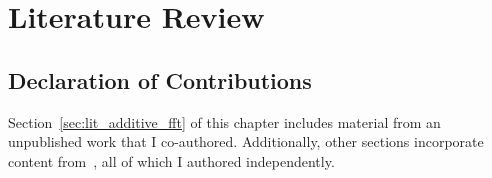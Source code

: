 \chapter{Literature Review}\label{ch:lit_review}

\section*{Declaration of Contributions}
Section~\ref{sec:lit_additive_fft} of this chapter includes material from an unpublished work that I co-authored. Additionally, other sections incorporate content from~\cite{Badakhshan2024Zupply, Badakhshan2023Outline, Badakhshan2025AuroraZupply}, all of which I authored independently.

%
%
%
%
%
%
%



